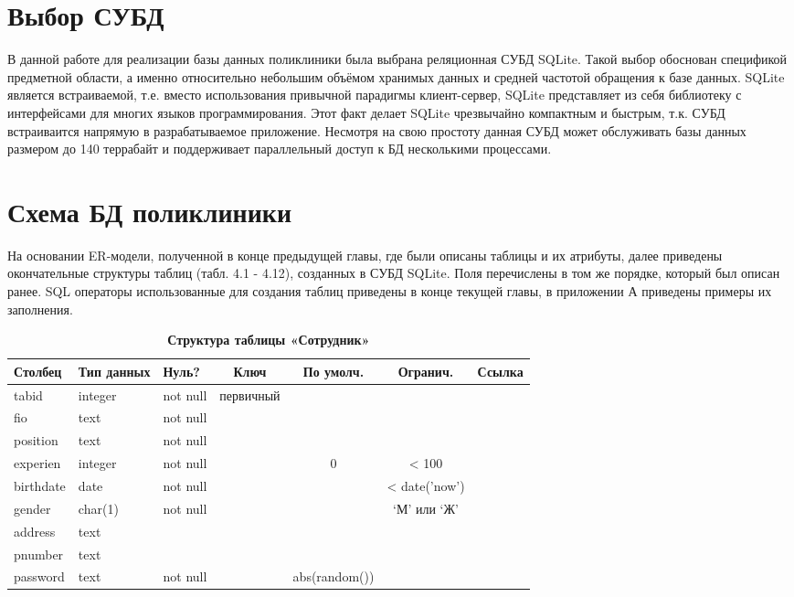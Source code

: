 \documentclass[14pt,a4paper,russian]{extreport}
\begin{document}
\section{Выбор СУБД}
В данной работе для реализации базы данных поликлиники была выбрана реляционная СУБД
SQLite. Такой выбор обоснован спецификой предметной области, а именно относительно небольшим
объёмом хранимых данных и средней частотой обращения к базе данных. SQLite является
встраиваемой, т.е. вместо использования привычной парадигмы клиент-сервер, SQLite представляет из
себя библиотеку с интерфейсами для многих языков программирования. Этот факт делает SQLite
чрезвычайно компактным и быстрым, т.к. СУБД встраиваится напрямую в разрабатываемое приложение.
Несмотря на свою простоту данная СУБД может обслуживать базы данных размером до 140 террабайт и
поддерживает параллельный доступ к БД несколькими процессами. \cite{sqlite}


\section{Схема БД поликлиники}
На основании ER-модели, полученной в конце предыдущей главы, где были описаны таблицы и их атрибуты,
далее приведены окончательные структуры таблиц (табл. 4.1 - 4.12), созданных в СУБД SQLite. Поля перечислены в
том же порядке, который был описан ранее. SQL операторы
использованные для создания таблиц приведены в конце текущей главы, в приложении А приведены примеры их
заполнения.


\begin{table}[h!]
    \caption{ } 
    \begin{subtable}[t]{\textwidth}
        \caption{\textbf{Структура таблицы «Сотрудник»}}
    \begin{tabularx}{\textwidth}{| X | X | X | c | c | c | X |}
        \hline
        \textbf{Столбец} & \textbf{Тип данных} & \textbf{Нуль?} & \textbf{Ключ} & \textbf{По
        умолч.} & \textbf{Огранич.} & \textbf{Ссылка} \\ \hline
        tabid & integer & not null & первичный & & &  \\ \hline
        fio & text & not null & & & & \\ \hline
        position & text & not null & & & & \\ \hline
        experien & integer & not null & & 0 & < 100 & \\ \hline
        birthdate & date & not null & & & < date('now') & \\ \hline
        gender & char(1) & not null & & & `М' или `Ж' & \\ \hline
        address & text & & & & & \\ \hline
        pnumber & text & & & & & \\ \hline
        password & text & not null & & abs(random()) & & \\ \hline
    \end{tabularx}
    \end{subtable}
    \label{table:emp}
\end{table}
\end{document}
